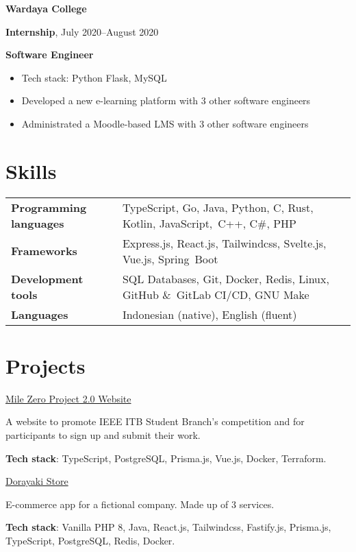 \documentclass[10pt]{article}
\newcommand{\workExpVspace}{0.2em}
\newcommand{\workExp}[6]{
    \noindent \textbf{#1}

    \textbf{#2}, #3--#4

    \textbf{#5}

    {#6}
    \vspace{\workExpVspace}
}
\newcommand{\project}[3]{
    \noindent \href{#2}{#1}

    {#3}
}
\begin{document}
\workExp
    {Wardaya College}
    {Internship}
    {July 2020}
    {August 2020}
    {Software Engineer}
    {
        \begin{itemize}
            \item Tech stack: Python Flask, MySQL
            \item Developed a new e-learning platform with 3 other software engineers
            \item Administrated a Moodle-based LMS with 3 other software engineers
        \end{itemize}
    }

\section{Skills}

\begin{tabularx}{\textwidth}{@{}X l}
\textbf{Programming languages} & TypeScript, Go, Java, Python, C, Rust, Kotlin, JavaScript,\
                                 C++, C\#, PHP \\
\textbf{Frameworks}            & Express.js, React.js, Tailwindcss, Svelte.js, Vue.js, Spring\
                                 Boot \\
\textbf{Development tools}     & SQL Databases, Git, Docker, Redis, Linux, GitHub \&\
                                 GitLab CI/CD, GNU Make \\
\textbf{Languages}             & Indonesian (native), English (fluent)
\end{tabularx}

\vspace{-0.5em}

\section{Projects}

\project
    {Mile Zero Project 2.0 Website}
    {https://milezeroproject.com}
    {
        A website to promote IEEE ITB Student Branch’s competition and for participants to sign up and
        submit their work.

        \textbf{Tech stack}: TypeScript, PostgreSQL, Prisma.js, Vue.js, Docker, Terraform.
     }

\project
    {Dorayaki Store}
    {https://gitlab.informatika.org/if3110-2021-02-16}
    {
        E-commerce app for a fictional company. Made up of 3 services.

        \textbf{Tech stack}: Vanilla PHP 8, Java, React.js, Tailwindcss, Fastify.js, Prisma.js,
        TypeScript, PostgreSQL, Redis, Docker.
    }
\end{document}
